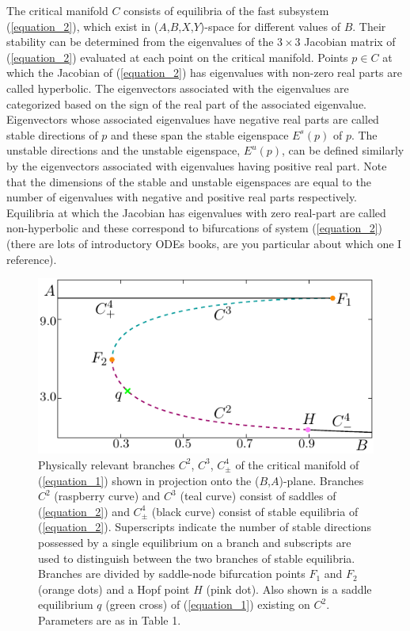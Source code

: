 \documentclass{ws-ijbc}
\begin{document}
The critical manifold $C$ consists of equilibria of the fast subsystem (\ref{equation_2}), which exist in ($A$,$B$,$X$,$Y$)-space for different values of $B$.  Their stability can be determined from the eigenvalues of the $3\times3$ Jacobian matrix of (\ref{equation_2}) evaluated at each point on the critical manifold.  Points $p \in C$ at which the Jacobian of (\ref{equation_2}) has eigenvalues with non-zero real parts are called hyperbolic.  The eigenvectors associated with the eigenvalues are categorized based on the sign of the real part of the associated eigenvalue.  Eigenvectors whose associated eigenvalues have negative real parts are called stable directions of $p$ and these span the stable eigenspace $E^{s}(p)$ of $p$.  The unstable directions and the unstable eigenspace, $E^{u}(p)$, can be defined similarly by the eigenvectors associated with eigenvalues having positive real part.  Note that the dimensions of the stable and unstable eigenspaces are equal to the number of eigenvalues with negative and positive real parts respectively.  Equilibria at which the Jacobian has eigenvalues with zero real-part are called non-hyperbolic and these correspond to bifurcations of system (\ref{equation_2}) (there are lots of introductory ODEs books, are you particular about which one I reference).

\begin{figure}[!t]
\centering
\includegraphics[]{./figures/MKMO_1.pdf}
\caption{Physically relevant branches $C^2$, $C^3$, $C^4_\pm$ of the critical manifold of (\ref{equation_1}) shown in projection onto the ($B$,$A$)-plane.  Branches $C^2$ (raspberry curve) and $C^3$ (teal curve) consist of saddles of (\ref{equation_2}) and $C^4_\pm$ (black curve) consist of stable equilibria of (\ref{equation_2}).  Superscripts indicate the number of stable directions possessed by a single equilibrium on a branch and subscripts are used to distinguish between the two branches of stable equilibria.  Branches are divided by saddle-node bifurcation points $F_1$ and $F_2$ (orange dots) and a Hopf point $H$ (pink dot).  Also shown is a saddle equilibrium $q$ (green cross) of (\ref{equation_1}) existing on $C^2$.  Parameters are as in Table 1.}
\label{MKMO_1}
\end{figure}
\end{document}
